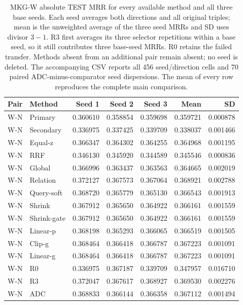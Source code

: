 \begin{table}[htbp]
\centering\footnotesize\setlength{\tabcolsep}{3pt}
\caption{MKG-W absolute TEST MRR for every available method and all three base seeds. Each seed averages both directions and all original triples; mean is the unweighted average of the three seed MRRs and SD uses divisor $3-1$. R3 first averages its three selector repetitions within a base seed, so it still contributes three base-seed MRRs. R0 retains the failed transfer. Methods absent from an additional pair remain absent; no seed is deleted. The accompanying CSV reports all 456 seed/direction cells and 70 paired ADC-minus-comparator seed dispersions. The mean of every row reproduces the complete main comparison.}
\label{tab:selection-seeds-mkgw}
\begin{tabular}{llrrrrr}
\toprule
Pair & Method & Seed 1 & Seed 2 & Seed 3 & Mean & SD\\
\midrule
W-N & Primary & 0.360610 & 0.358854 & 0.359698 & 0.359721 & 0.000878\\
W-N & Secondary & 0.336975 & 0.337425 & 0.339709 & 0.338037 & 0.001466\\
W-N & Equal-z & 0.366347 & 0.364302 & 0.364255 & 0.364968 & 0.001195\\
W-N & RRF & 0.346130 & 0.345920 & 0.344589 & 0.345546 & 0.000836\\
W-N & Global & 0.366996 & 0.363437 & 0.363563 & 0.364665 & 0.002019\\
W-N & Relation & 0.372127 & 0.367573 & 0.367064 & 0.368921 & 0.002788\\
W-N & Query-soft & 0.368720 & 0.365779 & 0.365130 & 0.366543 & 0.001913\\
W-N & Shrink & 0.367912 & 0.365650 & 0.364922 & 0.366161 & 0.001559\\
W-N & Shrink-gate & 0.367912 & 0.365650 & 0.364922 & 0.366161 & 0.001559\\
W-N & Linear-p & 0.368198 & 0.365293 & 0.366065 & 0.366519 & 0.001505\\
W-N & Clip-g & 0.368464 & 0.366418 & 0.366787 & 0.367223 & 0.001091\\
W-N & Linear-g & 0.368464 & 0.366418 & 0.366787 & 0.367223 & 0.001091\\
W-N & R0 & 0.336975 & 0.367187 & 0.339709 & 0.347957 & 0.016710\\
W-N & R3 & 0.372047 & 0.367617 & 0.368927 & 0.369530 & 0.002276\\
W-N & ADC & 0.368833 & 0.366144 & 0.366358 & 0.367112 & 0.001494\\

\end{tabular}
\end{table}
